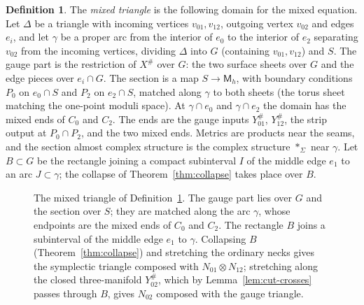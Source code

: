 \documentclass[11pt]{amsart}
\theoremstyle{definition}
\newtheorem{definition}[theorem]{Definition}
\theoremstyle{remark}
\theoremstyle{plain}
\numberwithin{equation}{section}
\newcommand{\Msf}{\mathsf{M}}
\begin{document}
\begin{definition}\label{def:mixed-triangle}
The \emph{mixed triangle} is the following domain for the mixed equation.
Let $\Delta$ be a triangle with incoming vertices $v_{01},v_{12}$, outgoing
vertex $v_{02}$ and edges $e_i$, and let $\gamma$ be a proper arc from the
interior of $e_0$ to the interior of $e_2$ separating $v_{02}$ from the incoming
vertices, dividing $\Delta$ into $G$ (containing $v_{01},v_{12}$) and $S$. The
gauge part is the restriction of $X^\#$ over $G$: the two surface sheets over
$G$ and the edge pieces over $e_i\cap G$. The section is a map $S\to\Msf_h$, with
boundary conditions $P_0$ on $e_0\cap S$ and $P_2$ on $e_2\cap S$, matched along
$\gamma$ to both sheets (the torus sheet matching the one-point moduli space).
At $\gamma\cap e_0$ and $\gamma\cap e_2$ the domain has the mixed ends of
$C_0$ and $C_2$. The ends are the gauge inputs $Y_{01}^\#$, $Y_{12}^\#$, the strip
output at $P_0\cap P_2$, and the two mixed ends. Metrics are products near
the seams, and the section almost complex structure is the complex structure $*_\Sigma$ near $\gamma$.
Let $B\subset G$ be the rectangle joining a compact subinterval $I$ of the middle edge $e_1$
to an arc $J\subset\gamma$; the collapse of Theorem~\ref{thm:collapse} takes place over $B$.
\end{definition}

\begin{figure}[ht]
\centering
{}
\caption{The mixed triangle of Definition~\ref{def:mixed-triangle}. The gauge part lies
over $G$ and the section over $S$; they are matched along the arc $\gamma$, whose
endpoints are the mixed ends of $C_0$ and $C_2$. The rectangle $B$ joins a
subinterval of the middle edge $e_1$ to $\gamma$. Collapsing $B$
(Theorem~\ref{thm:collapse}) and stretching the ordinary necks gives the symplectic
triangle composed with $N_{01}\otimes N_{12}$; stretching along the closed
three-manifold $Y_{02}^\#$, which by Lemma~\ref{lem:cut-crosses} passes through $B$,
gives $N_{02}$ composed with the gauge triangle.}
\label{fig:mixed-triangle}
\end{figure}
\end{document}
